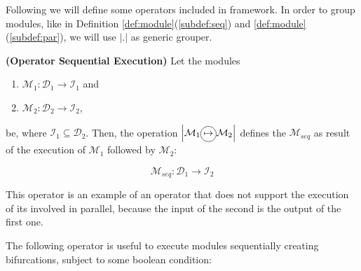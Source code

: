 Following we will define some operators included in \posl{} framework. In order to group modules, like in Definition \ref{def:module}(\ref{subdef:seq}) and \ref{def:module}(\ref{subdef:par}), we will use $\left|.\right|$ as generic grouper.




\begin{definition}\label{op:seqexec}
{\bf (Operator Sequential Execution)} Let the modules 
\begin{enumerate}%
	\item $\mathcal{M}_1 : \mathcal{D}_1 \rightarrow \mathcal{I}_1$ and 
	\item $\mathcal{M}_2 : \mathcal{D}_2 \rightarrow \mathcal{I}_2$, 
\end{enumerate}%
be, where $\mathcal{I}_1 \subseteq \mathcal{D}_2$. Then, the operation $\left|\mathcal{M}_1\circled{$\mapsto$} \mathcal{M}_2\right|$ defines the \cm{} $\mathcal{M}_{seq}$ as result of the execution of $\mathcal{M}_1$ followed by $\mathcal{M}_2$:

\[
\mathcal{M}_{seq}:\mathcal{D}_1 \rightarrow \mathcal{I}_2
\]
\end{definition}

This operator is an example of an operator that does not support the execution of its involved \cms{} in parallel, because the input of the second \cm{} is the output of the first one.

The following operator is useful to execute modules sequentially creating bifurcations, subject to some boolean condition:

